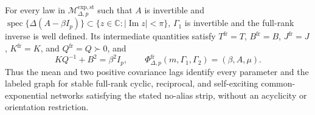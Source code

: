 For every law in \(\mathcal M_{\Delta,p}^{\mathrm{exp,st}}\) such that \(A\) is invertible and \(\operatorname{spec}\{\Delta(A-\beta I_p)\}\subset\{z\in\mathbb C:|\operatorname{Im}z|<\pi\}\), \(\Gamma_1\) is invertible and the full-rank inverse is well defined.  Its intermediate quantities satisfy \(T^{\mathrm{fr}}=T\), \(B^{\mathrm{fr}}=B\), \(J^{\mathrm{fr}}=J\), \(K^{\mathrm{fr}}=K\), and \(Q^{\mathrm{fr}}=Q\succ0\), and
\[
 KQ^{-1}+B^2=\beta^2I_p,\qquad
 \Phi^{\mathrm{fr}}_{\Delta,p}(m,\Gamma_1,\Gamma_2)=(\beta,A,\mu).
\]
Thus the mean and two positive covariance lags identify every parameter and the labeled graph for stable full-rank cyclic, reciprocal, and self-exciting common-exponential networks satisfying the stated no-alias strip, without an acyclicity or orientation restriction.